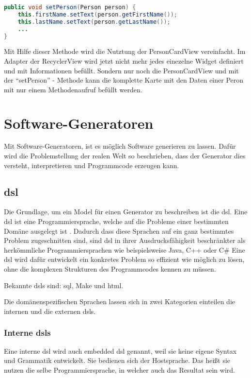 \begin{lstlisting}[label=lst:setPerson,
language=java,
firstnumber=1,
caption=\enquote{setPerson} - Methode aus der PersonCardView]				   
public void setPerson(Person person) {
	this.firstName.setText(person.getFirstName());
	this.lastName.setText(person.getLastName());	
	...
}
\end{lstlisting}

Mit Hilfe dieser Methode wird die Nutztung der PersonCardView vereinfacht. Im Adapter der RecyclerView wird jetzt nicht mehr jedes einezelne Widget definiert und mit Informationen befüllt. Sondern nur noch die PersonCardView und mit der \enquote{setPerson} - Methode kann die komplette Karte mit den Daten einer Peron mit nur einem Methodenaufruf befüllt werden.

\section{Software-Generatoren}\label{sec:generators}

Mit Software-Generatoren, ist es möglich Software generieren zu lassen. Dafür wird die Problemstellung der realen Welt so beschrieben, dass der Generator dies versteht, interpretieren und Programmcode erzeugen kann.

\subsection{\acf{dsl}}\label{sec:dsl}
Die Grundlage, um ein Model für einen Generator zu beschreiben ist die \acl{dsl}.
Eine \acs{dsl} ist eine Programmiersprache, welche auf die Probleme einer bestimmten Domäne ausgelegt ist \cite{dslHudak}. Dadurch dass diese Sprachen auf ein ganz bestimmtes Problem zugeschnitten sind, sind \acl{dsl} in ihrer Ausdrucksfähigkeit beschränkter als herkömmliche Programmiersprachen wie beispielsweise Java, C++ oder C\# Eine \acl{dsl} wird dafür entwickelt ein konkretes Problem so effizient wie möglich zu lösen, ohne die komplexen Strukturen des Programmcodes kennen zu müssen.

Bekannte \aclp{dsl} sind: \ac{sql}, Make und \acf{html}.

Die domänenspezifischen Sprachen lassen sich in zwei Kategorien einteilen die internen und die externen \acsp{dsl}.

\subsubsection{Interne \acsp{dsl}} \label{sec:intern}
Eine interne \acs{dsl} wird auch embedded \acs{dsl} genannt, weil sie keine eigene Syntax und Grammatik entwickelt. Sie bedienen sich der Hostsprache. Das heißt sie nutzen die selbe Programmiersprache, in welcher auch das Resultat sein wird.

